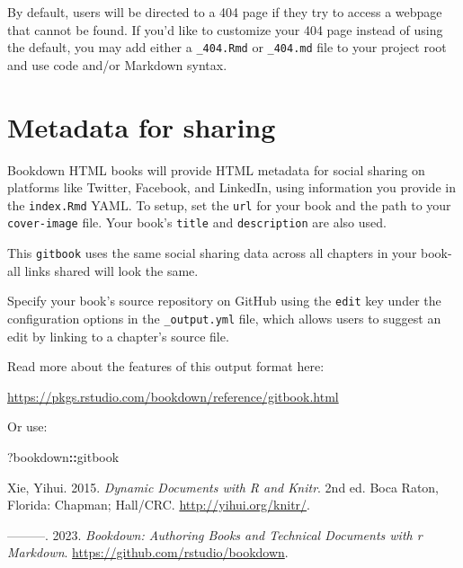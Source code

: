\documentclass[
]{book}
\newenvironment{Shaded}{\begin{snugshade}}{\end{snugshade}}
\newcommand{\NormalTok}[1]{#1}
\newcommand{\SpecialCharTok}[1]{\textcolor[rgb]{0.81,0.36,0.00}{\textbf{#1}}}
\newlength{\cslhangindent}
\newlength{\cslentryspacingunit} %
\newenvironment{CSLReferences}[2] %
 {%
  \setlength{\parindent}{0pt}
  \ifodd #1
  \let\oldpar\par
  \def\par{\hangindent=\cslhangindent\oldpar}
  \fi
  \setlength{\parskip}{#2\cslentryspacingunit}
 }%
 {}
\begin{document}
By default, users will be directed to a 404 page if they try to access a
webpage that cannot be found. If you'd like to customize your 404 page
instead of using the default, you may add either a \texttt{\_404.Rmd} or
\texttt{\_404.md} file to your project root and use code and/or Markdown
syntax.

\hypertarget{metadata-for-sharing}{%
\section{Metadata for sharing}\label{metadata-for-sharing}}

Bookdown HTML books will provide HTML metadata for social sharing on
platforms like Twitter, Facebook, and LinkedIn, using information you
provide in the \texttt{index.Rmd} YAML. To setup, set the \texttt{url}
for your book and the path to your \texttt{cover-image} file. Your
book's \texttt{title} and \texttt{description} are also used.

This \texttt{gitbook} uses the same social sharing data across all
chapters in your book- all links shared will look the same.

Specify your book's source repository on GitHub using the \texttt{edit}
key under the configuration options in the \texttt{\_output.yml} file,
which allows users to suggest an edit by linking to a chapter's source
file.

Read more about the features of this output format here:

\url{https://pkgs.rstudio.com/bookdown/reference/gitbook.html}

Or use:

\begin{Shaded}
\begin{Highlighting}[]
\NormalTok{?bookdown}\SpecialCharTok{::}\NormalTok{gitbook}
\end{Highlighting}
\end{Shaded}

\hypertarget{refs}{}
\begin{CSLReferences}{1}{0}
\leavevmode{}%
Xie, Yihui. 2015. \emph{Dynamic Documents with {R} and Knitr}. 2nd ed.
Boca Raton, Florida: Chapman; Hall/CRC. \url{http://yihui.org/knitr/}.

\leavevmode{}%
---------. 2023. \emph{Bookdown: Authoring Books and Technical Documents
with r Markdown}. \url{https://github.com/rstudio/bookdown}.

\end{CSLReferences}

\backmatter
\end{document}
